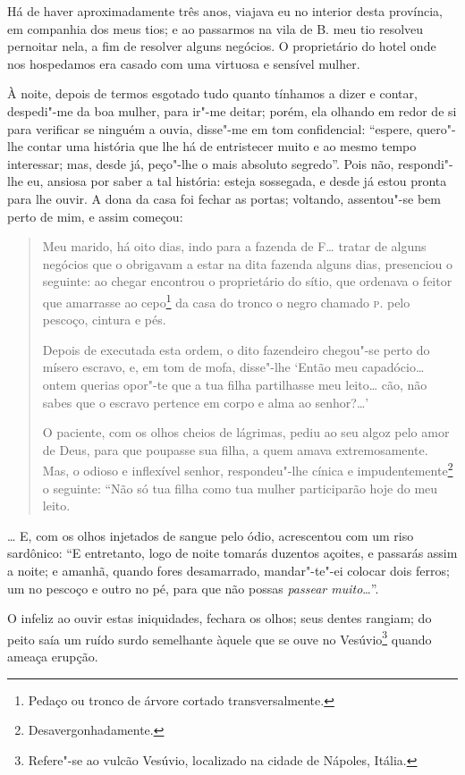 Há de haver aproximadamente três anos, viajava eu no interior desta
província, em companhia dos meus tios; e ao passarmos na vila de B. meu
tio resolveu pernoitar nela, a fim de resolver alguns negócios. O
proprietário do hotel onde nos hospedamos era casado com uma virtuosa e
sensível mulher.

À noite, depois de termos esgotado tudo quanto tínhamos a dizer e
contar, despedi"-me da boa mulher, para ir"-me deitar; porém, ela olhando
em redor de si para verificar se ninguém a ouvia, disse"-me em tom
confidencial: ``espere, quero"-lhe contar uma história que lhe há de
entristecer muito e ao mesmo tempo interessar; mas, desde já, peço"-lhe o
mais absoluto segredo''. Pois não, respondi"-lhe eu, ansiosa por saber a
tal história: esteja sossegada, e desde já estou pronta para lhe ouvir.
A dona da casa foi fechar as portas; voltando, assentou"-se bem perto de
mim, e assim começou:

\begin{quote}
Meu marido, há oito dias, indo para a fazenda de F\ldots{} tratar de alguns
negócios que o obrigavam a estar na dita fazenda alguns dias, presenciou
o seguinte: ao chegar encontrou o proprietário do sítio, que ordenava o
feitor que amarrasse ao cepo\footnote{Pedaço ou tronco de árvore
  cortado transversalmente.} da casa do tronco o negro chamado \textsc{p}. pelo
pescoço, cintura e pés.

Depois de executada esta ordem, o dito fazendeiro chegou"-se perto do
mísero escravo, e, em tom de mofa, disse"-lhe `Então meu capadócio\ldots{}
ontem querias opor"-te que a tua filha partilhasse meu leito\ldots{} cão, não
sabes que o escravo pertence em corpo e alma ao senhor?\ldots{}'

O paciente, com os olhos cheios de lágrimas, pediu ao seu algoz pelo
amor de Deus, para que poupasse sua filha, a quem amava extremosamente.
Mas, o odioso e inflexível senhor, respondeu"-lhe cínica e
impudentemente\footnote{Desavergonhadamente.} o seguinte: ``Não só tua
filha como tua mulher participarão hoje do meu leito.
\end{quote}

\ldots{} E, com os olhos injetados de sangue pelo ódio, acrescentou com um
riso sardônico: ``E entretanto, logo de noite tomarás duzentos açoites, e
passarás assim a noite; e amanhã, quando fores desamarrado, mandar"-te"-ei
colocar dois ferros; um no pescoço e outro no pé, para que não possas
\emph{passear muito}\ldots{}''.

O infeliz ao ouvir estas iniquidades, fechara os olhos; seus dentes
rangiam; do peito saía um ruído surdo semelhante àquele que se ouve no
Vesúvio\footnote{Refere"-se ao vulcão Vesúvio, localizado na cidade de
  Nápoles, Itália.} quando ameaça erupção.


